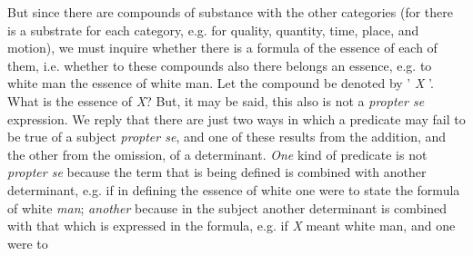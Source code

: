 But since there are compounds of substance with the other
categories (for there is a substrate for each category, e.g. for quality, quantity, time, place, and motion), we must inquire whether there is a formula of the essence of each of them, i.e. whether to these compounds also there belongs an essence, e.g. to white man the essence of white man. Let the compound be denoted by ' \emph{X} '. What is the essence of \emph{X}? But, it may be said, this also is not a \emph{propter se} expression. We reply that there are just two ways in which a predicate may fail to be true of a subject \emph{propter se}, and one of these results from the addition, and the other from the omission, of a determinant. \emph{One} kind of predicate is not \emph{propter se} because the term that is being defined is combined with another determinant, e.g. if in defining the essence of white one were to state the formula of white \emph{man}; \emph{another} because in the subject another determinant is combined with that which is expressed in the formula, e.g. if \emph{X} meant white man, and one were to

